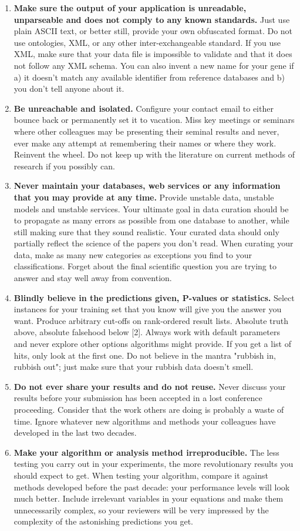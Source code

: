 \documentclass[11pt,twoside,a4paper]{article}
\begin{document}
\begin{enumerate}
	\item \textbf{Make sure the output of your application is unreadable, unparseable and does not comply to any known standards. } Just use plain ASCII text, or better still, provide your own obfuscated format. Do not use ontologies, XML, or any other inter-exchangeable standard. If you use XML, make sure that your data file is impossible to validate and that it does not follow any XML schema. You can also invent a new name for your gene if a) it doesn't match any available identifier from reference databases and b) you don't tell anyone about it.
	\item \textbf{Be unreachable and isolated. } Configure your contact email to either bounce back or permanently set it to vacation. Miss key meetings or seminars where other colleagues may be presenting their seminal results and never, ever make any attempt at remembering their names or where they work. Reinvent the wheel. Do not keep up with the literature on current methods of research if you possibly can.
	\item \textbf{Never maintain your databases, web services or any information that you may provide at any time. } Provide unstable data, unstable models and unstable services. Your ultimate goal in data curation should be to propagate as many errors as possible from one database to another, while still making sure that they sound realistic. Your curated data should only partially reflect the science of the papers you don't read. When curating your data, make as many new categories as exceptions you find to your classifications. Forget about the final scientific question you are trying to answer and stay well away from convention.
	\item \textbf{Blindly believe in the predictions given, P-values or statistics. } Select instances for your training set that you know will give you the answer you want. Produce arbitrary cut-offs on rank-ordered result lists. Absolute truth above, absolute falsehood below [2]. Always work with default parameters and never explore other options algorithms might provide. If you get a list of hits, only look at the first one. Do not believe in the mantra "rubbish in, rubbish out"; just make sure that your rubbish data doesn't smell.
	\item \textbf{Do not ever share your results and do not reuse. } Never discuss your results before your submission has been accepted in a lost conference proceeding. Consider that the work others are doing is probably a waste of time. Ignore whatever new algorithms and methods your colleagues have developed in the last two decades.
	\item \textbf{Make your algorithm or analysis method irreproducible. } The less testing you carry out in your experiments, the more revolutionary results you should expect to get. When testing your algorithm, compare it against methods developed before the past decade: your performance levels will look much better. Include irrelevant variables in your equations and make them unnecessarily complex, so your reviewers will be very impressed by the complexity of the astonishing predictions you get.
\end{enumerate}
\end{document}
